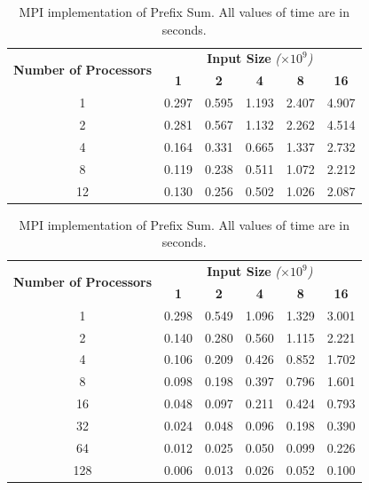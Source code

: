 \documentclass[11pt]{article}
\begin{document}
\begin{table}
\setlength{\tabcolsep}{15pt}
    \begin{center}
    \begin{tabular}{|c|c|c|c|c|c|}
    \hline
    \multirow{2}{*}{\textbf{Number of Processors}} & \multicolumn{5}{c|}{\textbf{Input Size} \emph{($\times10^{9}$)}} \\ \cline{2-6}
                         & \textbf{1} & \textbf{2} & \textbf{4} & \textbf{8} & \textbf{16} \\ \hline
    1                    & 0.297    & 0.595    & 1.193    & 2.407    & 4.907 \\ \hline
    2                    & 0.281	   & 0.567    & 1.132    & 2.262    & 4.514 \\ \hline
    4                    & 0.164    & 0.331    & 0.665    & 1.337    & 2.732 \\ \hline
    8                    & 0.119    & 0.238    & 0.511    & 1.072    & 2.212 \\ \hline
    12                   & 0.130   & 0.256    & 0.502    & 1.026    & 2.087 \\ \hline
    \end{tabular}
    \end{center}
    \caption{OpenMP implementation of Prefix Sum. All values of time are in seconds.}
    
    \begin{center}
    \begin{tabular}{|c|c|c|c|c|c|}
    \hline
    \multirow{2}{*}{\textbf{Number of Processors}} & \multicolumn{5}{c|}{\textbf{Input Size} \emph{($\times10^{9}$)}} \\ \cline{2-6}
                         & \textbf{1} & \textbf{2} & \textbf{4} & \textbf{8} & \textbf{16} \\ \hline
    1                    & 0.298    & 0.549    & 1.096    & 1.329    & 3.001 \\ \hline
    2                    & 0.140	& 0.280    & 0.560    & 1.115    & 2.221 \\ \hline
    4                    & 0.106    & 0.209    & 0.426    & 0.852    & 1.702 \\ \hline
    8                    & 0.098    & 0.198    & 0.397    & 0.796    & 1.601 \\ \hline
    16                   & 0.048    & 0.097    & 0.211    & 0.424    & 0.793 \\ \hline
    32                   & 0.024    & 0.048    & 0.096    & 0.198    & 0.390 \\ \hline
    64                   & 0.012    & 0.025    & 0.050    & 0.099    & 0.226 \\ \hline
    128                  & 0.006    & 0.013    & 0.026    & 0.052    & 0.100 \\ \hline
    \end{tabular}
    \end{center}
    \caption{MPI implementation of Prefix Sum. All values of time are in seconds.}
    
\end{table}
\end{document}
